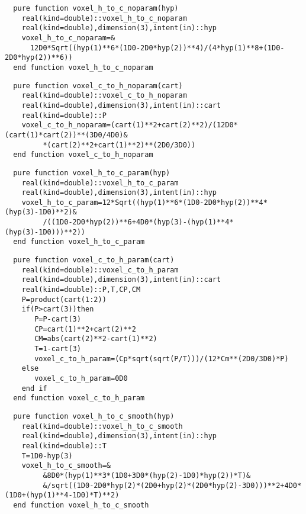 \begin{Verbatim}
  pure function voxel_h_to_c_noparam(hyp)
    real(kind=double)::voxel_h_to_c_noparam
    real(kind=double),dimension(3),intent(in)::hyp
    voxel_h_to_c_noparam=&
      12D0*Sqrt((hyp(1)**6*(1D0-2D0*hyp(2))**4)/(4*hyp(1)**8+(1D0-2D0*hyp(2))**6))
  end function voxel_h_to_c_noparam
\end{Verbatim}

\begin{Verbatim}
  pure function voxel_c_to_h_noparam(cart)
    real(kind=double)::voxel_c_to_h_noparam
    real(kind=double),dimension(3),intent(in)::cart
    real(kind=double)::P
    voxel_c_to_h_noparam=(cart(1)**2+cart(2)**2)/(12D0*(cart(1)*cart(2))**(3D0/4D0)&
         *(cart(2)**2+cart(1)**2)**(2D0/3D0))
  end function voxel_c_to_h_noparam
\end{Verbatim}

\begin{Verbatim}
  pure function voxel_h_to_c_param(hyp)
    real(kind=double)::voxel_h_to_c_param
    real(kind=double),dimension(3),intent(in)::hyp
    voxel_h_to_c_param=12*Sqrt((hyp(1)**6*(1D0-2D0*hyp(2))**4*(hyp(3)-1D0)**2)&
         /((1D0-2D0*hyp(2))**6+4D0*(hyp(3)-(hyp(1)**4*(hyp(3)-1D0)))**2))
  end function voxel_h_to_c_param
\end{Verbatim}

\begin{Verbatim}
  pure function voxel_c_to_h_param(cart)
    real(kind=double)::voxel_c_to_h_param
    real(kind=double),dimension(3),intent(in)::cart
    real(kind=double)::P,T,CP,CM
    P=product(cart(1:2))
    if(P>cart(3))then
       P=P-cart(3)
       CP=cart(1)**2+cart(2)**2
       CM=abs(cart(2)**2-cart(1)**2)
       T=1-cart(3)
       voxel_c_to_h_param=(Cp*sqrt(sqrt(P/T)))/(12*Cm**(2D0/3D0)*P)
    else
       voxel_c_to_h_param=0D0
    end if
  end function voxel_c_to_h_param
\end{Verbatim}

\begin{Verbatim}
  pure function voxel_h_to_c_smooth(hyp)
    real(kind=double)::voxel_h_to_c_smooth
    real(kind=double),dimension(3),intent(in)::hyp
    real(kind=double)::T
    T=1D0-hyp(3)
    voxel_h_to_c_smooth=&
         &8D0*(hyp(1)**3*(1D0+3D0*(hyp(2)-1D0)*hyp(2))*T)&
         &/sqrt((1D0-2D0*hyp(2)*(2D0+hyp(2)*(2D0*hyp(2)-3D0)))**2+4D0*(1D0+(hyp(1)**4-1D0)*T)**2)
  end function voxel_h_to_c_smooth
\end{Verbatim}

